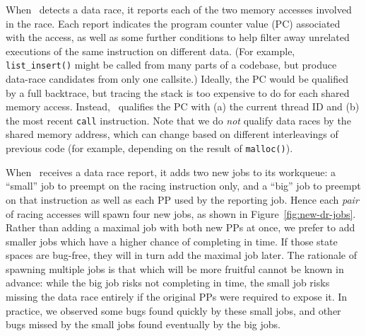 When \landslide~detects a data race, it reports each of the two memory accesses involved in the race.
Each report indicates the program counter value (PC) associated with the access, as well as some further conditions to help filter away unrelated executions of the same instruction on different data.
(For example, {\tt list\_insert()} might be called from many parts of a codebase, but produce data-race candidates from only one callsite.)
Ideally, the PC would be qualified by a full backtrace, but tracing the stack is too expensive to do for each shared memory access.
Instead, \landslide~qualifies the PC with
(a) the current thread ID and
(b) the most recent {\tt call} instruction.
Note that we do {\em not} qualify data races by the shared memory address,
which can change based on different interleavings of previous code
(for example, depending on the result of {\tt malloc()}).


When \quicksand~receives a data race report, it adds two new jobs to its workqueue:
a ``small'' job to preempt on the racing instruction only,
and a ``big'' job to preempt on that instruction as well as each PP used by the reporting job.
%
Hence each {\em pair} of racing accesses will spawn four new jobs, as shown in Figure~\ref{fig:new-dr-jobs}.
Rather than adding a maximal job with both new PPs at once, we prefer to add smaller jobs which have a higher chance of completing in time.
If those state spaces are bug-free, they will in turn add the maximal job later.
%
The rationale of spawning multiple jobs is that which will be more fruitful cannot be known in advance:
while the big job risks not completing in time,
the small job risks missing the data race entirely if the original PPs were required to expose it.
In practice, we observed some bugs found quickly by these small jobs, and other bugs missed by the small jobs found eventually by the big jobs.



